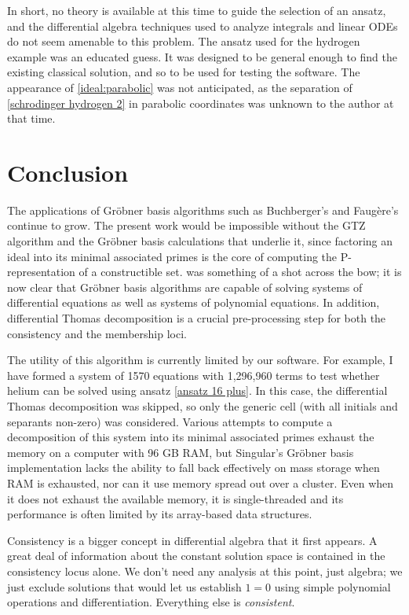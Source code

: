 \documentclass{article}
\theoremstyle{definition}
\theoremstyle{plain}
\begin{document}
In short, no theory is available at this time to guide the selection of an ansatz,
and the differential algebra techniques used to analyze integrals and linear ODEs do not seem amenable
to this problem.
The ansatz used for the hydrogen example
was an educated guess.  It was designed to be general enough to find the existing
classical solution, and so to be used for testing the software.  The appearance of \eqref{ideal:parabolic}
was not anticipated, as the separation of \eqref{schrodinger hydrogen 2} in parabolic coordinates was unknown
to the author at that time.



\section{Conclusion}
\label{sec:Conclusion}

The applications of Gr\"obner basis algorithms such as Buchberger's and Faug\`ere's
continue to grow.  The present work would be impossible without the GTZ algorithm and the
Gr\"obner basis calculations that underlie it, since factoring an ideal into its minimal associated primes
is the core of computing the P-representation of a constructible set.
\cite{Chaharbashloo2013} was something
of a shot across the bow; it is now clear that Gr\"obner basis algorithms are capable
of solving systems of differential equations as well as systems of polynomial equations.
In addition, differential Thomas decomposition is a crucial pre-processing step for both the consistency and the membership loci.

The utility of this algorithm is currently limited by our software.
For example, I have formed a system of 1570 equations with 1,296,960 terms
to test whether helium can be solved using ansatz \eqref{ansatz 16 plus}.
In this case, the differential Thomas decomposition was skipped, so only the generic
cell (with all initials and separants non-zero) was considered.
Various attempts to compute a decomposition of this system into its minimal associated primes exhaust the
memory on a computer with 96 GB RAM,
but Singular's Gr\"obner basis implementation lacks the ability to
fall back effectively on mass storage when RAM is exhausted, nor
can it use memory spread out over a cluster.
Even when it does not exhaust the available memory,
it is single-threaded and its performance is often limited by its array-based data structures.

Consistency is a bigger concept in differential algebra that it first appears.  A great deal of information
about the constant solution space is contained in the consistency locus alone.  We don't
need any analysis at this point, just algebra; we just exclude solutions that would let us
establish $1 = 0$ using simple polynomial operations and differentiation.  Everything else is {\it consistent}.
\end{document}
